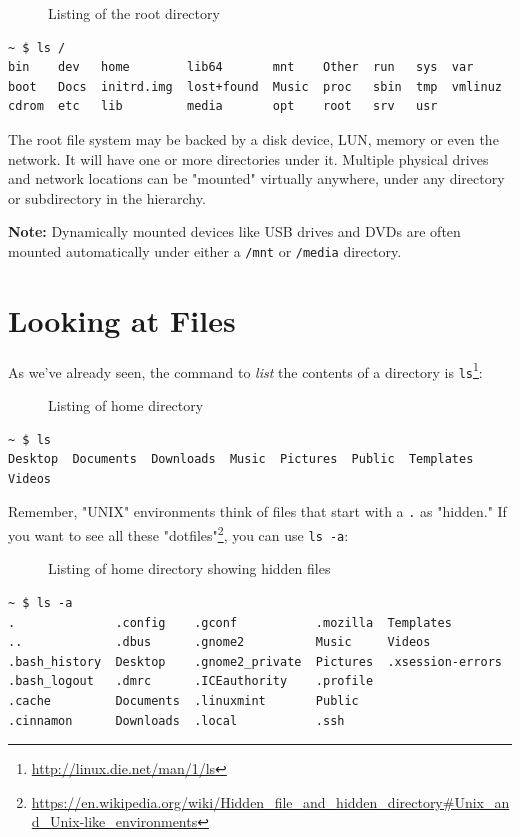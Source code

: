 \documentclass[10pt,]{book}
\renewcommand{\href}[2]{#2\footnote{\url{#1}}}
\numberwithin{figure}{chapter}
\DeclareRobustCommand{\drcap}[1]{\begin{figure}[H]\caption{#1}\end{figure}}
\DeclareRobustCommand{\drcmd}[1]{\index{Commands!#1}}
\begin{document}
\drcap{Listing of the root directory}

\begin{verbatim}
~ $ ls /
bin    dev   home        lib64       mnt    Other  run   sys  var
boot   Docs  initrd.img  lost+found  Music  proc   sbin  tmp  vmlinuz
cdrom  etc   lib         media       opt    root   srv   usr
\end{verbatim}

The root file system may be backed by a disk device, LUN, memory or even
the network. It will have one or more directories under it. Multiple
physical drives and network locations can be "mounted" virtually
anywhere, under any directory or subdirectory in the hierarchy.

\textbf{Note:} Dynamically mounted devices like USB drives and DVDs are
often mounted automatically under either a \texttt{/mnt} or
\texttt{/media} directory.

\section*{Looking at Files}\label{looking-at-files}

As we've already seen, the command to \emph{list} the contents of a
directory is
\href{http://linux.die.net/man/1/ls}{\texttt{ls}}\drcmd{ls}:

\drcap{Listing of home directory}

\begin{verbatim}
~ $ ls
Desktop  Documents  Downloads  Music  Pictures  Public  Templates  Videos
\end{verbatim}

Remember, "UNIX" environments think of files that start with a
\texttt{.} as "hidden." If you want to see all these
\href{https://en.wikipedia.org/wiki/Hidden_file_and_hidden_directory\#Unix_and_Unix-like_environments}{"dotfiles"},
you can use \texttt{ls -a}:

\drcap{Listing of home directory showing hidden files}

\begin{verbatim}
~ $ ls -a
.              .config    .gconf           .mozilla  Templates
..             .dbus      .gnome2          Music     Videos
.bash_history  Desktop    .gnome2_private  Pictures  .xsession-errors
.bash_logout   .dmrc      .ICEauthority    .profile
.cache         Documents  .linuxmint       Public
.cinnamon      Downloads  .local           .ssh
\end{verbatim}
\end{document}
